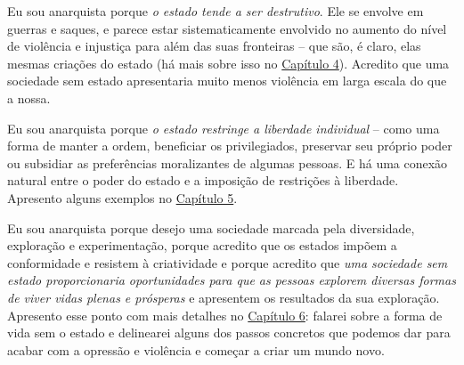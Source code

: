 Eu sou anarquista porque \emph{o estado tende a ser destrutivo}. Ele se envolve em guerras e saques, e parece estar sistematicamente envolvido no aumento do nível de violência e injustiça para além das suas fronteiras -- que são, é claro, elas mesmas criações do estado (há mais sobre isso no \hyperref[chap:4]{Capítulo 4}). Acredito que uma sociedade sem estado apresentaria muito menos violência em larga escala do que a nossa.

Eu sou anarquista porque \emph{o estado restringe a liberdade individual} -- como uma forma de manter a ordem, beneficiar os privilegiados, preservar seu próprio poder ou subsidiar as preferências moralizantes de algumas pessoas. E há uma conexão natural entre o poder do estado e a imposição de restrições à liberdade. Apresento alguns exemplos no \hyperref[chap:5]{Capítulo 5}.

Eu sou anarquista porque desejo uma sociedade marcada pela diversidade, exploração e experimentação, porque acredito que os estados impõem a conformidade e resistem à criatividade e porque acredito que \emph{uma sociedade sem estado proporcionaria oportunidades para que as pessoas explorem diversas formas de viver vidas plenas e prósperas} e apresentem os resultados da sua exploração. Apresento esse ponto com mais detalhes no \hyperref[chap:6]{Capítulo 6}: falarei sobre a forma de vida sem o estado e delinearei alguns dos passos concretos que podemos dar para acabar com a opressão e violência e começar a criar um mundo novo.